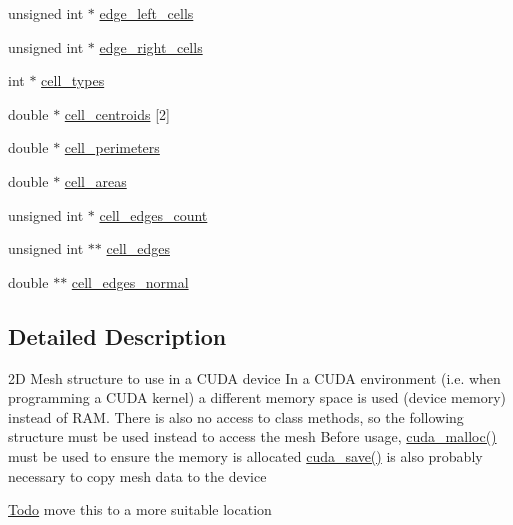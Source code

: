\begin{DoxyCompactItemize}
unsigned int $\ast$ \hyperlink{structFVL_1_1CFVMesh2D_1_1s__CFVMesh2D_a8463782b95c009bc930bb652940a058d}{edge\_\-left\_\-cells}
\item 
unsigned int $\ast$ \hyperlink{structFVL_1_1CFVMesh2D_1_1s__CFVMesh2D_a12742c2714c22273a62a9ce07ee66b41}{edge\_\-right\_\-cells}
\item 
int $\ast$ \hyperlink{structFVL_1_1CFVMesh2D_1_1s__CFVMesh2D_ad14f92db99fb4e9eeb32130a0040bae1}{cell\_\-types}
\item 
double $\ast$ \hyperlink{structFVL_1_1CFVMesh2D_1_1s__CFVMesh2D_a8c79b87f51ced5f0b842fe427a78df74}{cell\_\-centroids} \mbox{[}2\mbox{]}
\item 
double $\ast$ \hyperlink{structFVL_1_1CFVMesh2D_1_1s__CFVMesh2D_a7dd44790f0dbfbb2a7e516c73bea9e0f}{cell\_\-perimeters}
\item 
double $\ast$ \hyperlink{structFVL_1_1CFVMesh2D_1_1s__CFVMesh2D_a9a1f21aa2b9dddf34f776ea755a21064}{cell\_\-areas}
\item 
unsigned int $\ast$ \hyperlink{structFVL_1_1CFVMesh2D_1_1s__CFVMesh2D_a708e8512deb92f5502d4d30441a9d34e}{cell\_\-edges\_\-count}
\item 
unsigned int $\ast$$\ast$ \hyperlink{structFVL_1_1CFVMesh2D_1_1s__CFVMesh2D_a4ef3d78e05fd966917b46c2736dbdaa2}{cell\_\-edges}
\item 
double $\ast$$\ast$ \hyperlink{structFVL_1_1CFVMesh2D_1_1s__CFVMesh2D_a86b664ea19f349d9560b02deb0058f5d}{cell\_\-edges\_\-normal}
\end{DoxyCompactItemize}


\subsection{Detailed Description}
2D Mesh structure to use in a CUDA device In a CUDA environment (i.e. when programming a CUDA kernel) a different memory space is used (device memory) instead of RAM. There is also no access to class methods, so the following structure must be used instead to access the mesh Before usage, \hyperlink{classFVL_1_1CFVMesh2D_aef4ea33ee543863ae0aaf24102980c39}{cuda\_\-malloc()} must be used to ensure the memory is allocated \hyperlink{classFVL_1_1CFVMesh2D_a4a8349ac162541bae551a003c465390a}{cuda\_\-save()} is also probably necessary to copy mesh data to the device

\begin{Desc}
\item[\hyperlink{todo__todo000003}{Todo}]move this to a more suitable location \end{Desc}


